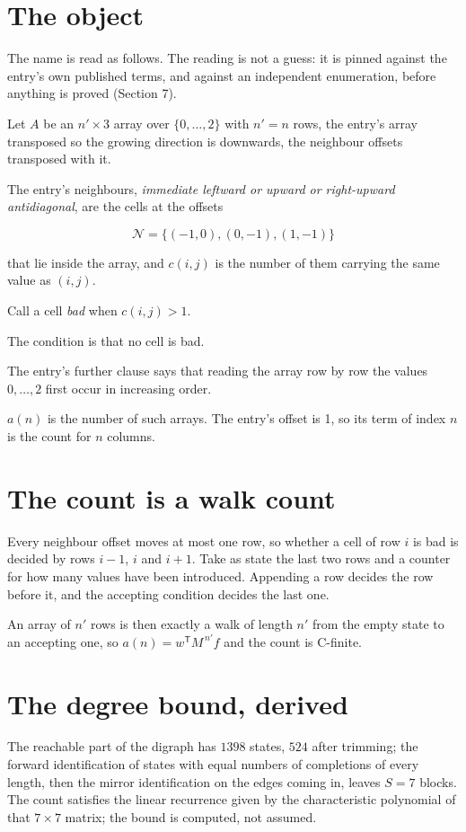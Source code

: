 \documentclass[11pt]{article}
\theoremstyle{definition}
\begin{document}
\section{The object}

The name is read as follows. The reading is not a guess: it is pinned against the entry's own published terms, and against an independent enumeration, before anything is proved (Section 7).

Let $A$ be an $n' \times 3$ array over $\{0,\dots,2\}$ with $n' = n$ rows, the entry's array transposed so the growing direction is downwards, the neighbour offsets transposed with it.

The entry's neighbours, {\itshape immediate leftward or upward or right-upward antidiagonal}, are the cells at the offsets

\[\mathcal{N} = \{(-1,0), (0,-1), (1,-1)\}\]

that lie inside the array, and $c(i,j)$ is the number of them carrying the same value as $(i,j)$.

Call a cell {\itshape bad} when $c(i,j) > 1$.

The condition is that no cell is bad.

The entry's further clause says that reading the array row by row the values $0,\dots,2$ first occur in increasing order.

$a(n)$ is the number of such arrays. The entry's offset is 1, so its term of index $n$ is the count for $n$ columns.

\section{The count is a walk count}

Every neighbour offset moves at most one row, so whether a cell of row $i$ is bad is decided by rows $i-1$, $i$ and $i+1$. Take as state the last two rows and a counter for how many values have been introduced. Appending a row decides the row before it, and the accepting condition decides the last one.

An array of $n'$ rows is then exactly a walk of length $n'$ from the empty state to an accepting one, so $a(n) = w^{\mathsf T}M^{\,n'}f$ and the count is C-finite.

\section{The degree bound, derived}

The reachable part of the digraph has $1398$ states, $524$ after trimming; the forward identification of states with equal numbers of completions of every length, then the mirror identification on the edges coming in, leaves $S = 7$ blocks. The count satisfies the linear recurrence given by the characteristic polynomial of that $7\times7$ matrix; the bound is computed, not assumed.
\end{document}
